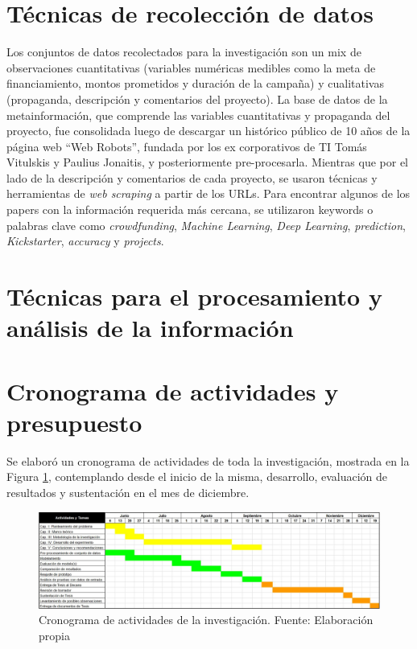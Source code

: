 \section{Técnicas de recolección de datos}
Los conjuntos de datos recolectados para la investigación son un mix de observaciones cuantitativas (variables numéricas medibles como la meta de financiamiento, montos prometidos y duración de la campaña) y cualitativas (propaganda, descripción y comentarios del proyecto). La base de datos de la metainformación, que comprende las variables cuantitativas y propaganda del proyecto, fue consolidada luego de descargar un histórico público de 10 años de la página web “Web Robots”, fundada por los ex corporativos de TI Tomás Vitulskis y Paulius Jonaitis, y posteriormente pre-procesarla. Mientras que por el lado de la descripción y comentarios de cada proyecto, se usaron técnicas y herramientas de \textit{web scraping} a partir de los URLs. Para encontrar algunos de los papers con la información requerida más cercana, se utilizaron keywords o palabras clave como \textit{crowdfunding}, \textit{Machine Learning}, \textit{Deep Learning}, \textit{prediction}, \textit{Kickstarter}, \textit{accuracy} y \textit{projects}.


\section{Técnicas para el procesamiento y análisis de la información}



\section{Cronograma de actividades y presupuesto}
Se elaboró un cronograma de actividades de toda la investigación, mostrada en la Figura \ref{3:fig2}, contemplando desde el inicio de la misma, desarrollo, evaluación de resultados y sustentación en el mes de diciembre.
\begin{figure}[h]
	\begin{center}
		\includegraphics[width=1.1\textwidth]{3/figures/cronograma.jpg}
		\caption{Cronograma de actividades de la investigación. Fuente: Elaboración propia}
		\label{3:fig2}
	\end{center}
\end{figure}